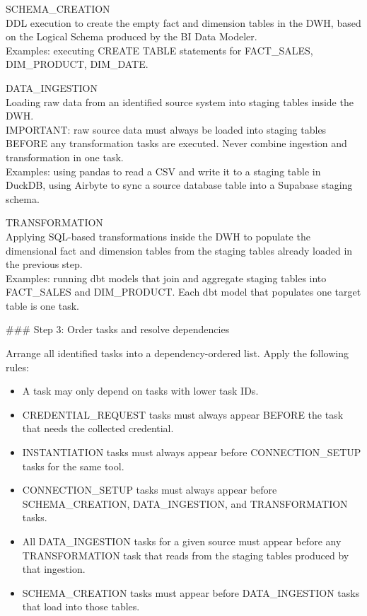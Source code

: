 SCHEMA\_CREATION \\
DDL execution to create the empty fact and dimension tables in the DWH, based on the Logical Schema produced by the BI Data Modeler. \\
Examples: executing CREATE TABLE statements for FACT\_SALES, DIM\_PRODUCT, DIM\_DATE.
\newline

DATA\_INGESTION \\
Loading raw data from an identified source system into staging tables inside the DWH. \\
IMPORTANT: raw source data must always be loaded into staging tables BEFORE any transformation tasks are executed. Never combine ingestion and transformation in one task. \\
Examples: using pandas to read a CSV and write it to a staging table in DuckDB, using Airbyte to sync a source database table into a Supabase staging schema.
\newline

TRANSFORMATION \\
Applying SQL-based transformations inside the DWH to populate the dimensional fact and dimension tables from the staging tables already loaded in the previous step. \\
Examples: running dbt models that join and aggregate staging tables into FACT\_SALES and DIM\_PRODUCT. Each dbt model that populates one target table is one task.
\newline

\#\#\# Step 3: Order tasks and resolve dependencies
\newline

Arrange all identified tasks into a dependency-ordered list. Apply the following rules:
\newline

\begin{itemize}
    \item A task may only depend on tasks with lower task IDs.
    \item CREDENTIAL\_REQUEST tasks must always appear BEFORE the task that needs the collected credential.
    \item INSTANTIATION tasks must always appear before CONNECTION\_SETUP tasks for the same tool.
    \item CONNECTION\_SETUP tasks must always appear before SCHEMA\_CREATION, DATA\_INGESTION, and TRANSFORMATION tasks.
    \item All DATA\_INGESTION tasks for a given source must appear before any TRANSFORMATION task that reads from the staging tables produced by that ingestion.
    \item SCHEMA\_CREATION tasks must appear before DATA\_INGESTION tasks that load into those tables.
\end{itemize}

